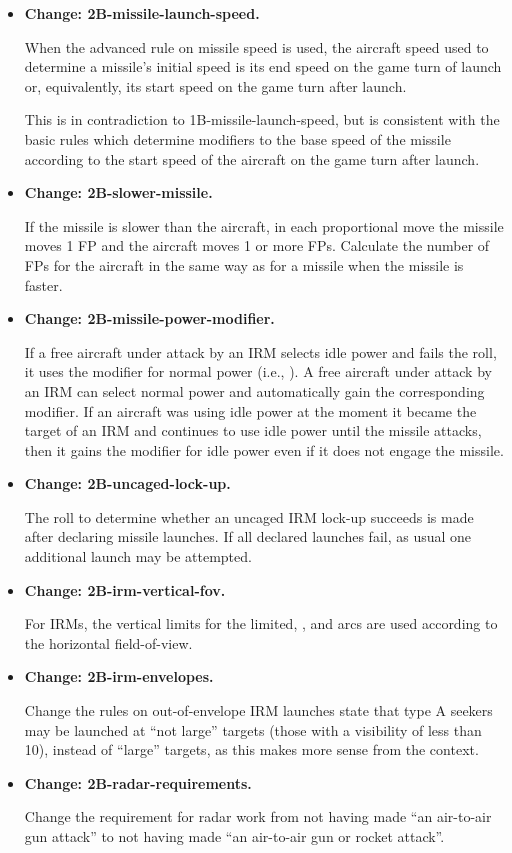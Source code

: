 \documentclass[10pt]{report}
\newcommand{\itemtag}[1]{\item \textbf{Change: #1.}\par}
\begin{document}
\begin{itemize}
    \itemtag{2B-missile-launch-speed} When the advanced rule on missile speed is used, the aircraft speed used to determine a missile's initial speed is its end speed on the game turn of launch or, equivalently, its start speed on the game turn after launch. 
    
    This is in contradiction to 1B-missile-launch-speed, but is consistent with the basic rules which determine modifiers to the base speed of the missile according to the start speed of the aircraft on the game turn after launch.
    
    \itemtag{2B-slower-missile} If the missile is slower than the aircraft, in each proportional move the missile moves 1 FP and the aircraft moves 1 or more FPs. Calculate the number of FPs for the aircraft in the same way as for a missile when the missile is faster.
    
    \itemtag{2B-missile-power-modifier} If a free aircraft under attack by an IRM selects idle power and fails the roll, it uses the modifier for normal power (i.e., ). A free aircraft under attack by an IRM can select normal power and automatically gain the corresponding modifier. If an aircraft was using idle power at the moment it became the target of an IRM and continues to use idle power until the missile attacks, then it gains the  modifier for idle power even if it does not engage the missile.
    
    \itemtag{2B-uncaged-lock-up} The roll to determine whether an uncaged IRM lock-up succeeds is made after declaring missile launches. If all declared launches fail, as usual one additional launch may be attempted.

    \itemtag{2B-irm-vertical-fov} For IRMs, the vertical limits for the limited, , and  arcs are used according to the horizontal field-of-view.

    \itemtag{2B-irm-envelopes} Change the rules on out-of-envelope IRM launches state that type A seekers may be launched at “not large” targets (those with a visibility of less than 10), instead of “large” targets, as this makes more sense from the context.

    \itemtag{2B-radar-requirements} Change the requirement for radar work from not having made “an air-to-air gun attack” to not having made “an air-to-air gun or rocket attack”.
    


\end{itemize}
\end{document}
